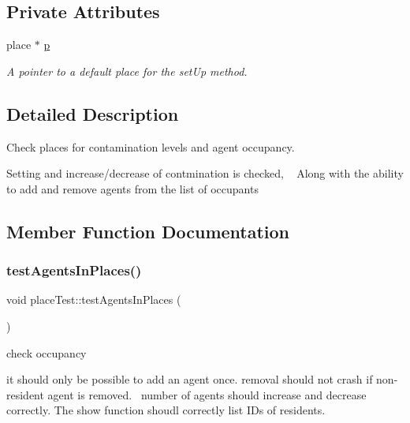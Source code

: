 \subsection*{Private Attributes}
\begin{DoxyCompactItemize}
\item 
\mbox{\label{classplaceTest_a0f4e660bdadc034488490bbadc33e09f}} 
place $\ast$ \mbox{\hyperlink{classplaceTest_a0f4e660bdadc034488490bbadc33e09f}{p}}
\begin{DoxyCompactList}\small\item\em A pointer to a default place for the set\+Up method. \end{DoxyCompactList}\end{DoxyCompactItemize}


\subsection{Detailed Description}
Check places for contamination levels and agent occupancy. 

Setting and increase/decrease of contmination is checked, ~\newline
Along with the ability to add and remove agents from the list of occupants 

\subsection{Member Function Documentation}
\mbox{\label{classplaceTest_a095889ea563a243152e41a0e05fffbc2}} 
\subsubsection{\texorpdfstring{test\+Agents\+In\+Places()}{testAgentsInPlaces()}}
{\footnotesize\ttfamily void place\+Test\+::test\+Agents\+In\+Places (\begin{DoxyParamCaption}{ }\end{DoxyParamCaption})\hspace{0.3cm}{\ttfamily [inline]}}



check occupancy 

it should only be possible to add an agent once. removal should not crash if non-\/resident agent is removed.~\newline
number of agents should increase and decrease correctly. The show function shoudl correctly list I\+Ds of residents. \mbox{\label{classplaceTest_a12e071effa88774bb49e498632d19846}} 
